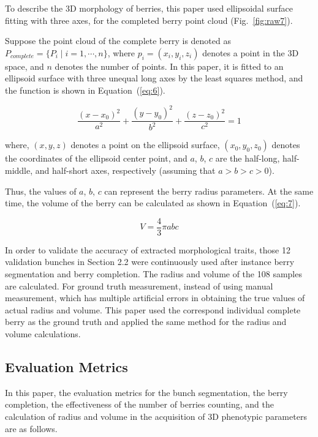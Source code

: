 \documentclass[12pt]{article}
\begin{document}
To describe the 3D morphology of berries, this paper used ellipsoidal surface fitting with three axes, for the completed berry point cloud (Fig.~\ref{fig:raw7}).


Suppose the point cloud of the complete berry is denoted as $P_{complete}=\{P_i \mid i=1, \cdots,n\}$, where $p_i=(x_i,y_i,z_i)$ denotes a point in the 3D space, and $n$ denotes the number of points. 
In this paper, it is fitted to an ellipsoid surface with three unequal long axes by the least squares method, and the function is shown in Equation~(\ref{eq:6}).

\begin{equation}
    \frac{(x-x_0)^2}{a^2} + \frac{(y-y_0)^2}{b^2} + \frac{(z-z_0)^2}{c^2} = 1
    \label{eq:6}
\end{equation}

{\raggedright where, $(x,y,z)$ denotes a point on the ellipsoid surface, $(x_0,y_0,z_0)$ denotes the coordinates of the ellipsoid center point, and $a$, $b$, $c$ are the half-long, half-middle, and half-short axes, respectively (assuming that $a>b>c>0$). }

Thus, the values of $a$, $b$, $c$ can represent the berry radius parameters. 
At the same time, the volume of the berry can be calculated as shown in Equation~(\ref{eq:7}).

\begin{equation}
    V=\frac{4}{3} \pi a b c
    \label{eq:7}
\end{equation}

In order to validate the accuracy of extracted morphological traits, those 12 validation bunches in %
Section 2.2 were continuously used after instance berry segmentation and berry completion. 
The radius and volume of the 108 samples are calculated. 
For ground truth measurement, instead of using manual measurement, which has multiple artificial errors in obtaining the true values of actual radius and volume. 
This paper used the correspond individual complete berry as the ground truth and applied the same method for the radius and volume calculations. 

\subsection{Evaluation Metrics}

In this paper, the evaluation metrics for the bunch segmentation, the berry completion, the effectiveness of the number of berries counting, and the calculation of radius and volume in the acquisition of 3D phenotypic parameters are as follows.
\end{document}
